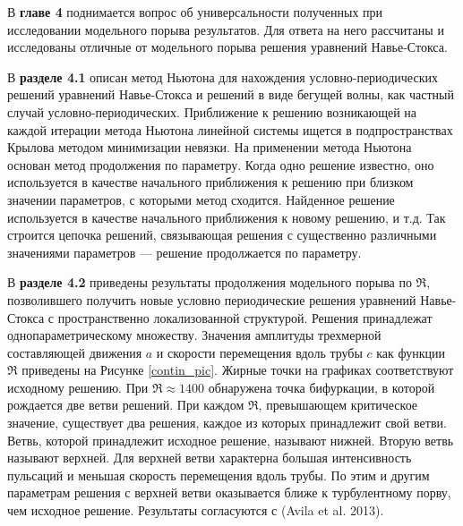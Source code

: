 В \textbf{главе 4} поднимается вопрос об универсальности полученных при исследовании модельного порыва результатов. Для ответа на него рассчитаны и исследованы отличные от модельного порыва решения уравнений Навье-Стокса. 

В \textbf{разделе 4.1} описан метод Ньютона для нахождения условно-периодических решений уравнений Навье-Стокса и решений в виде бегущей волны, как частный случай условно-периодических. Приближение к решению возникающей на каждой итерации метода Ньютона линейной системы ищется в подпространствах Крылова методом минимизации невязки. 
На применении метода Ньютона основан метод продолжения по параметру. Когда одно решение известно, оно используется в качестве начального приближения к решению при близком значении параметров, с которыми метод сходится. Найденное решение используется в качестве начального приближения к новому решению, и т.д. Так строится цепочка решений, связывающая решения с существенно различными значениями параметров --- решение продолжается по параметру.


В \textbf{разделе 4.2} приведены результаты продолжения модельного порыва по $\Re$, позволившего получить новые условно периодические решения уравнений Навье-Стокса с пространственно локализованной структурой. Решения принадлежат однопараметрическому множеству. Значения амплитуды трехмерной составляющей движения $a$ и скорости перемещения вдоль трубы $c$ как функции $\Re$ приведены на Рисунке \ref{contin_pic}. Жирные точки на графиках соответствуют исходному решению. При $\Re \approx 1400$ обнаружена точка бифуркации, в которой рождается две ветви решений. При каждом $\Re$, превышающем критическое значение, существует два решения, каждое из которых принадлежит свой ветви. 
Ветвь, которой принадлежит исходное решение, называют нижней. Вторую ветвь называют верхней. Для верхней ветви характерна большая интенсивность пульсаций и меньшая скорость перемещения вдоль трубы. По этим и другим параметрам решения с верхней ветви оказывается ближе к турбулентному порву, чем исходное решение. Результаты согласуются с (Avila et al. 2013). 


